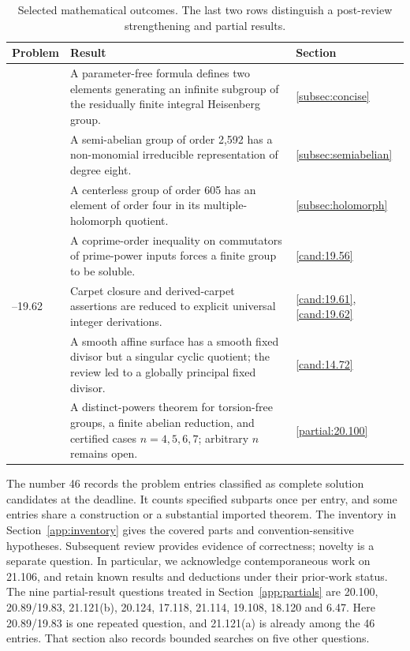 \begin{table}[htbp]
\centering\small
\caption{Selected mathematical outcomes. The last two rows distinguish a
post-review strengthening and partial results.}
\label{tab:highlights}
\begin{tabular}{@{}>{\raggedright\arraybackslash}p{}>{\raggedright\arraybackslash}p{}>{\raggedright\arraybackslash}p{}@{}}
\toprule
Problem & Result & Section\\\midrule
21.106 & A parameter-free formula defines two elements generating an infinite subgroup of the residually finite integral Heisenberg group. & \ref{subsec:concise}\\[3pt]
21.68 & A semi-abelian group of order 2,592 has a non-monomial irreducible representation of degree eight. & \ref{subsec:semiabelian}\\[3pt]
20.108 & A centerless group of order 605 has an element of order four in its multiple-holomorph quotient. & \ref{subsec:holomorph}\\[3pt]
19.56 & A coprime-order inequality on commutators of prime-power inputs forces a finite group to be soluble. & \ref{cand:19.56}\\[3pt]
19.61--19.62 & Carpet closure and derived-carpet assertions are reduced to explicit universal integer derivations. & \ref{cand:19.61}, \ref{cand:19.62}\\[3pt]
14.72 & A smooth affine surface has a smooth fixed divisor but a singular cyclic quotient; the review led to a globally principal fixed divisor. & \ref{cand:14.72}\\[3pt]
20.100 & A distinct-powers theorem for torsion-free groups, a finite abelian reduction, and certified cases \(n=4,5,6,7\); arbitrary \(n\) remains open. & \ref{partial:20.100}\\
\bottomrule
\end{tabular}
\end{table}

The number 46 records the problem entries classified as complete solution
candidates at the deadline. It counts specified subparts once per entry,
and some entries share a construction or a substantial imported theorem.
The inventory in Section~\ref{app:inventory} gives the covered parts and
convention-sensitive hypotheses. Subsequent review provides evidence of
correctness; novelty is a separate question. In particular, we acknowledge
contemporaneous work on 21.106, and retain known results and deductions
under their prior-work status. The nine partial-result questions treated
in Section~\ref{app:partials} are 20.100, 20.89/19.83, 21.121(b), 20.124,
17.118, 21.114, 19.108, 18.120 and 6.47. Here 20.89/19.83 is one repeated
question, and 21.121(a) is already among the 46 entries. That section also
records bounded searches on five other questions.

